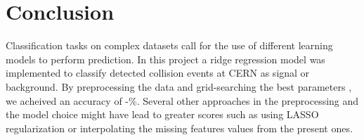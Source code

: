 \documentclass[10pt,conference,compsocconf]{IEEEtran}
\begin{document}
\section{Conclusion}
Classification tasks on complex datasets call for the use of different learning models to perform prediction. In this project a ridge regression model was implemented to classify detected collision events at CERN as signal or background. By preprocessing the data and grid-searching the best parameters , we acheived an accuracy of -\%. Several other approaches in the preprocessing and the model choice might have lead to greater scores such as using LASSO regularization or interpolating the missing features values from the present ones.
\end{document}
